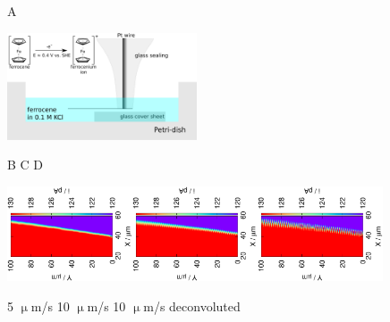 \documentclass[a4paper, 11pt, oneside, bibliography=totoc]{article}
\begin{document}
\begin{figure}
\centering
\begin{flushleft} \hspace{3cm}A\end{flushleft}

\includegraphics[width=0.5\textwidth]{step.eps}
\vspace{0.5cm}

\hspace{0.3cm} B \hspace{3.4cm} C \hspace{3.6cm} D \hfill

\includegraphics[trim = 10mm 60mm 0mm 60mm, clip, width=0.33\textwidth, angle=-90]{1.eps}\includegraphics[trim = 10mm 60mm 0mm 60mm, clip, width=0.33\textwidth, angle=-90]{2_meandered.eps}\includegraphics[trim = 10mm 60mm 0mm 60mm, clip, width=0.33\textwidth, angle=-90]{2_meandered_deconvoluted.eps}

\hspace{1.3cm} 5 $\upmu$m/s \hspace{2.5cm} 10 $\upmu$m/s \hspace{1.2cm} 10 $\upmu$m/s deconvoluted \hfill


\end{figure}
\end{document}
